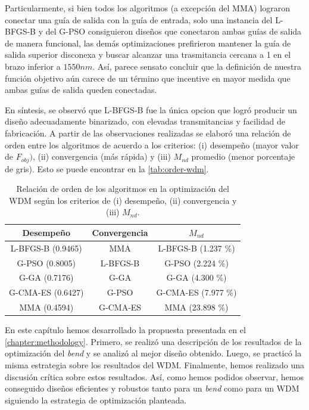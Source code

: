 Particularmente, si bien todos los algoritmos (a excepción del MMA) lograron conectar
una guía de salida con la guía de entrada, solo una instancia del L-BFGS-B y del G-PSO
consiguieron diseños que conectaron ambas guías de salida de manera funcional,
las demás optimizaciones prefirieron mantener la guía de salida superior disconexa
y buscar alcanzar una trasmitancia cercana a 1 en el brazo inferior a $1550 nm$.
Así, parece sensato concluir que la definición de nuestra función objetivo aún carece de un
término que incentive en mayor medida que ambas guías de salida queden conectadas.

En síntesis, se observó que L-BFGS-B fue la única opcion que logró
producir un diseño adecuadamente binarizado, con elevadas transmitancias y 
facilidad de fabricación.
A partir de las observaciones realizadas se elaboró una relación de orden entre los 
algoritmos de acuerdo a los criterios: 
(i) desempeño (mayor valor de $F_{obj})$, 
(ii) convergencia (más rápida) y 
(iii) $M_{nd}$ promedio (menor porcentaje de gris).
Esto se puede encontrar en la \autoref{tab:order-wdm}.

\begin{table}[ht]
    \centering
    \begin{tabular}{|c|c|c|}
    \hline 
    Desempeño &  Convergencia & $M_{nd} $\\
    \hline 
    L-BFGS-B (0.9465) & MMA       &  L-BFGS-B (1.237 \%) \\
    G-PSO (0.8005)    & L-BFGS-B  & G-PSO (2.224 \%) \\
    G-GA (0.7176)     & G-GA      & G-GA (4.300 \%) \\
    G-CMA-ES (0.6427) & G-PSO     & G-CMA-ES (7.977 \%) \\
    MMA (0.4594)      & G-CMA-ES  & MMA (23.898 \%) \\
    \hline 
    \end{tabular}
    \caption{Relación de orden de los algoritmos en la optimización del WDM según
             los criterios de (i) desempeño, (ii) convergencia y (iii) $M_{nd}$.}
    \label{tab:order-wdm}
\end{table}

En este capítulo hemos desarrollado la propuesta presentada en el \autoref{chapter:methodology}.
Primero, se realizó una descripción de los resultados de la optimización del \emph{bend} y 
se analizó al mejor diseño obtenido. 
Luego, se practicó la misma estrategia sobre los resultados del WDM.
Finalmente, hemos realizado una discusión crítica sobre estos resultados.
Así, como hemos podidos observar, hemos conseguido diseños eficientes y robustos tanto para un \emph{bend}
como para un WDM siguiendo la estrategia de optimización planteada.

